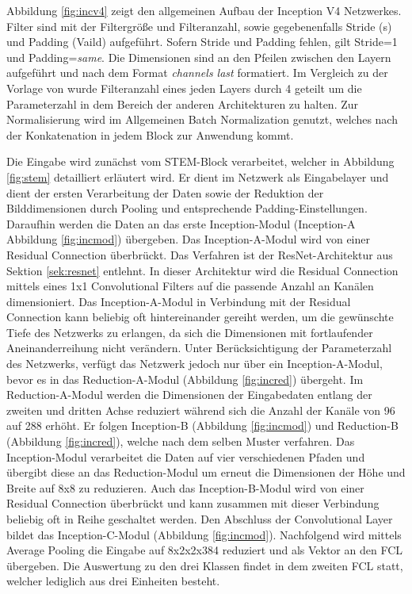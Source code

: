 Abbildung \ref{fig:incv4} zeigt den allgemeinen Aufbau der Inception V4 Netzwerkes. Filter sind mit der Filtergröße und Filteranzahl, sowie gegebenenfalls Stride (s) und Padding (Vaild) aufgeführt. Sofern Stride und Padding fehlen, gilt Stride=1 und Padding=\textit{same}. Die Dimensionen sind an den Pfeilen zwischen den Layern aufgeführt und nach dem Format \textit{channels last} formatiert. Im Vergleich zu der Vorlage von \textcite{DBLP:journals/corr/SzegedyIV16} wurde Filteranzahl eines jeden Layers durch 4 geteilt um die Parameterzahl in dem Bereich der anderen Architekturen zu halten. Zur Normalisierung wird im Allgemeinen Batch Normalization genutzt, welches nach der Konkatenation in jedem Block zur Anwendung kommt. 

Die Eingabe wird zunächst vom STEM-Block verarbeitet, welcher in Abbildung \ref{fig:stem} detailliert erläutert wird. Er dient im Netzwerk als Eingabelayer und dient der ersten Verarbeitung der Daten sowie der Reduktion der Bilddimensionen durch Pooling und entsprechende Padding-Einstellungen. Daraufhin werden die Daten an das erste Inception-Modul (Inception-A Abbildung \ref{fig:incmod}) übergeben. Das Inception-A-Modul wird von einer Residual Connection überbrückt. Das Verfahren ist der ResNet-Architektur aus Sektion \ref{sek:resnet} entlehnt. In dieser Architektur wird die Residual Connection mittels eines 1x1 Convolutional Filters auf die passende Anzahl an Kanälen dimensioniert. Das Inception-A-Modul in Verbindung mit der Residual Connection kann beliebig oft hintereinander gereiht werden, um die gewünschte Tiefe des Netzwerks zu erlangen, da sich die Dimensionen mit fortlaufender Aneinanderreihung nicht verändern. Unter Berücksichtigung der Parameterzahl des Netzwerks, verfügt das Netzwerk jedoch nur über ein Inception-A-Modul, bevor es in das Reduction-A-Modul (Abbildung \ref{fig:incred}) übergeht. Im Reduction-A-Modul werden die Dimensionen der Eingabedaten entlang der zweiten und dritten Achse reduziert während sich die Anzahl der Kanäle von 96 auf 288 erhöht. Er folgen Inception-B (Abbildung \ref{fig:incmod}) und Reduction-B (Abbildung \ref{fig:incred}), welche nach dem selben Muster verfahren. Das Inception-Modul verarbeitet die Daten auf vier verschiedenen Pfaden und übergibt diese an das Reduction-Modul um erneut die Dimensionen der Höhe und Breite auf 8x8 zu reduzieren. Auch das Inception-B-Modul wird von einer Residual Connection überbrückt und kann zusammen mit dieser Verbindung beliebig oft in Reihe geschaltet werden. Den Abschluss der Convolutional Layer bildet das Inception-C-Modul (Abbildung \ref{fig:incmod}). Nachfolgend wird mittels Average Pooling die Eingabe auf 8x2x2x384 reduziert und als Vektor an den FCL übergeben. Die Auswertung zu den drei Klassen findet in dem zweiten FCL statt, welcher lediglich aus drei Einheiten besteht. 


